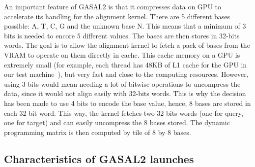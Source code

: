 %		
%			
%			
%			
%		
%		
%	
%		
%

An important feature of GASAL2 is that it compresses data on GPU to accelerate its handling for the alignment kernel. There are 5 different bases possible: A, T, C, G and the unknown base N. This means that a minimum of 3 bits is needed to encore 5 different values. The bases are then stores in 32-bits words. The goal is to allow the alignment kernel to fetch a pack of bases from the VRAM to operate on them directly in cache. This cache memory on a GPU is extremely small (for example, each thread has 48KB of L1 cache for the GPU in our test machine~\cite{nvidia:keplerarch}), but very fast and close to the computing resources.
However, using 3 bits would mean needing a lot of bitwise operations to uncompress the data, since it would not align easily with 32-bits words. This is why the decision has been made to use 4 bits to encode the base value, hence, 8 bases are stored in each 32-bit word. This way, the kernel fetches two 32 bits words (one for query, one for target) and can easily uncompress the 8 bases stored. The dynamic programming matrix is then computed by tile of 8 by 8 bases.


\subsection{Characteristics of GASAL2 launches}

